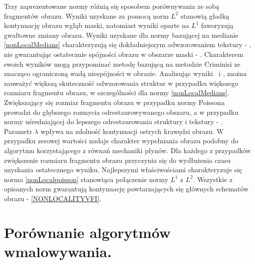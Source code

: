 \documentclass[12pt, twoside, openany]{report}
\theoremstyle{definition}
\begin{document}
Trzy zaprezentowane normy różnią się sposobem porównywania ze sobą fragmentów obrazu. Wyniki uzyskane za pomocą norm $L^2$ stanowią gładką kontynuację obrazu wgłąb maski, natomiast wyniki oparte na $L^1$ faworyzują gwałtowne zmiany obrazu. Wyniki uzyskane dla normy bazującej na medianie \eqref{nonLocalMedians} charakteryzują się dokładniejszym odwzorowaniem tekstury - \kotmyszm,  nie gwarantując ostatecznie spójności obrazu w obszarze maski - \ObrIVm. Charakterem swoich wyników mogą przypominać metodę bazującą na metodzie Criminisi ze znacząco ograniczoną wadą niespójności w obrazie. Analizując wyniki \maciekIm \ i \ObrXVIIm, można zauważyć większą skuteczność odwzorowania struktur w przypadku większego rozmiaru fragmentu obrazu, w szczególności dla normy \eqref{nonLocalMedians}. Zwiększający się  rozmiar fragmentu obrazu w przypadku normy Poissona prowadzi do głębszego rozmycia odrestaurowywanego obszaru, a w przypadku normy uśredniającej do lepszego odrestaurowania struktury i tekstury - \ObrIVm. Parametr $\lambda$ wpływa na zdolność kontynuacji ostrych krawędzi obrazu. W przypadku zerowej wartości nadaje charakter wypełniania obrazu podobny do algorytmu korzystającego z równań mechaniki płynów. Dla każdego z przypadków zwiększenie rozmiaru fragmentu obrazu przyczynia się do wydłużenia czasu uzyskania ostatecznego wyniku. Najlepszymi właściwościami charakteryzuje się norma \eqref{nonLocalpoisson} stanowiąca połączenie normy $L^1$ z $L^2$. Wszystkie z opisanych norm gwarantują kontynuację powtarzających się głównych schematów obrazu - \autoref{NONLOCALITYVFI}.
\section{Porównanie algorytmów wmalowywania.}
\end{document}
